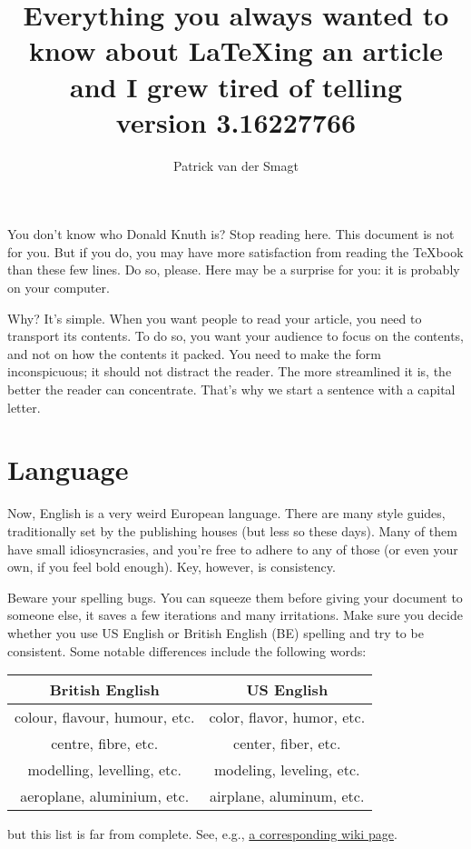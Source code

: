 \documentclass{article}
\title{Everything you always wanted to know about \LaTeX ing an article 
and I grew tired of telling\\[1ex]
\footnotesize{version 3.16227766}}
\author{Patrick van der Smagt}
\begin{document}
\maketitle

You don't know who Donald Knuth is?  Stop reading here.  This document is 
not for you.  But if you do, you may have more satisfaction from reading 
the \TeX book than these few lines.   Do so, please. Here may be a surprise for you: it is probably on your computer.

Why?
It's simple.
When you want people to read your article, you need to transport its contents. 
To do so, you want your audience to focus on the contents, and not on how the contents it packed.
You need to make the form inconspicuous; it should not distract the reader.
The more streamlined it is, the better the reader can concentrate.
That's why we start a sentence with a capital letter.



\section{Language}
Now, English is a very weird European language.
There are many style guides, traditionally set by the publishing houses (but less so these days).
Many of them have small idiosyncrasies, and you're free to adhere to any of those (or even your own, if you feel bold enough).
Key, however, is consistency.

Beware your spelling bugs.  You can squeeze them before giving your document to someone else, it saves a few iterations and many irritations.  Make sure you decide whether you use US English or British English (BE) spelling and try to be consistent.
Some notable differences include the following words:
\begin{center}\begin{tabular}{c|c}
British English & US English \\\hline
colour, flavour, humour, etc.	& color, flavor, humor, etc.\\
centre, fibre, etc.	& center, fiber, etc.\\
modelling, levelling, etc.		& modeling, leveling, etc.\\
aeroplane, aluminium, etc.			& airplane, aluminum, etc.
\end{tabular}\end{center}
but this list is far from complete.  See, e.g., \href{http://en.wikipedia.org/wiki/American_and_British_English_spelling_differences}{a corresponding wiki page}.
\end{document}
